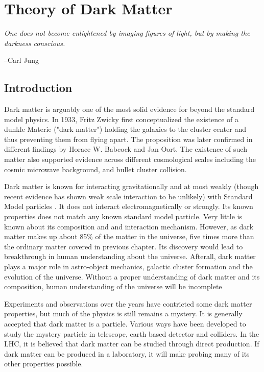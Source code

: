 \chapter{Theory of Dark Matter}


\epigraph{\textit{One does not become enlightened by imaging figures of light, but by making the darkness conscious.}}{--Carl Jung}


\section{Introduction}
    Dark matter is arguably one of the most solid evidence for beyond the standard model physics. In 1933, Fritz Zwicky first conceptualized the existence of a dunkle Materie ("dark matter") holding the galaxies to the cluster center and thus preventing them from flying apart. The proposition was later confirmed in different findings by Horace W. Babcock and Jan Oort. The existence of such matter also supported evidence across different cosmological scales including the cosmic microwave background, and bullet cluster collision.

    Dark matter is known for interacting gravitationally and at most weakly (though recent evidence has shown weak scale interaction to be unlikely) with Standard Model particles . It does not interact electromagnetically or strongly. Its known properties does not match any known standard model particle. Very little is known about its composition and and interaction mechanism. However, as dark matter makes up about 85\% of the matter in the universe, five times more than the ordinary matter covered in previous chapter. Its discovery would lead to breakthrough in human understanding about the universe. Afterall, dark matter plays a major role in astro-object mechanics, galactic cluster formation and the evolution of the universe. Without a proper understanding of dark matter and its composition, human understanding of the universe will be incomplete

    Experiments and observations over the years have contricted some dark matter properties, but much of the physics is still remains a mystery. It is generally accepted that dark matter is a particle. Various ways have been developed to study the mystery particle in telescope, earth based detector and colliders. In the LHC, it is believed that dark matter can be studied through direct production. If dark matter can be produced in a laboratory, it will make probing many of its other properties possible. 

